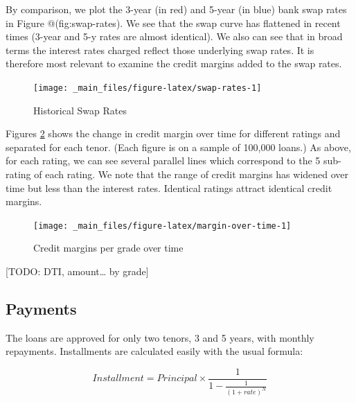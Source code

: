 \documentclass[11pt,]{report}
\begin{document}
\normalsize

By comparison, we plot the 3-year (in red) and 5-year (in blue) bank swap rates in Figure @(fig:swap-rates). We see that the swap curve has flattened in recent times (3-year and 5-y rates are almost identical). We also can see that in broad terms the interest rates charged reflect those underlying swap rates. It is therefore most relevant to examine the credit margins added to the swap rates.

\small

\begin{figure}

{\centering \texttt{[image: \_main\_files/figure-latex/swap-rates-1]} 

}

\caption{Historical Swap Rates}\label{fig:swap-rates}
\end{figure}

\normalsize

Figures \ref{fig:margin-over-time} shows the change in credit margin over time for different ratings and separated for each tenor. (Each figure is on a sample of 100,000 loans.) As above, for each rating, we can see several parallel lines which correspond to the 5 sub-rating of each rating. We note that the range of credit margins has widened over time but less than the interest rates. Identical ratings attract identical credit margins.

\small

\begin{figure}

{\centering \texttt{[image: \_main\_files/figure-latex/margin-over-time-1]} 

}

\caption{Credit margins per grade over time}\label{fig:margin-over-time}
\end{figure}

\normalsize

{[}TODO: DTI, amount\ldots{} by grade{]}

\hypertarget{payments}{%
\subsection{Payments}\label{payments}}

The loans are approved for only two tenors, 3 and 5 years, with monthly repayments. Installments are calculated easily with the usual formula:

\[
Installment = Principal \times \frac{1}{1 - \frac{1}{(1+rate)^N}}
\]
\end{document}
